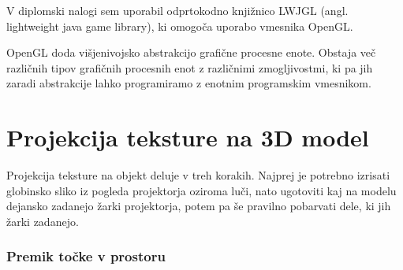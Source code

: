 \documentclass[a4paper, 12pt]{book}
\begin{document}
V diplomski nalogi sem uporabil odprtokodno knjižnico LWJGL (angl. lightweight java game library), ki omogoča uporabo vmesnika OpenGL.

OpenGL doda višjenivojsko abstrakcijo grafične procesne enote. Obstaja več različnih tipov grafičnih procesnih enot z različnimi zmogljivostmi, ki pa jih zaradi abstrakcije lahko programiramo z enotnim programskim vmesnikom. 
\section{Projekcija teksture na 3D model}

Projekcija teksture na objekt deluje v treh korakih. Najprej je potrebno izrisati globinsko sliko iz pogleda projektorja oziroma luči, nato ugotoviti kaj na modelu dejansko zadanejo žarki projektorja, potem pa še pravilno pobarvati dele, ki jih žarki zadanejo.

\subsubsection*{Premik točke v prostoru}
\end{document}
